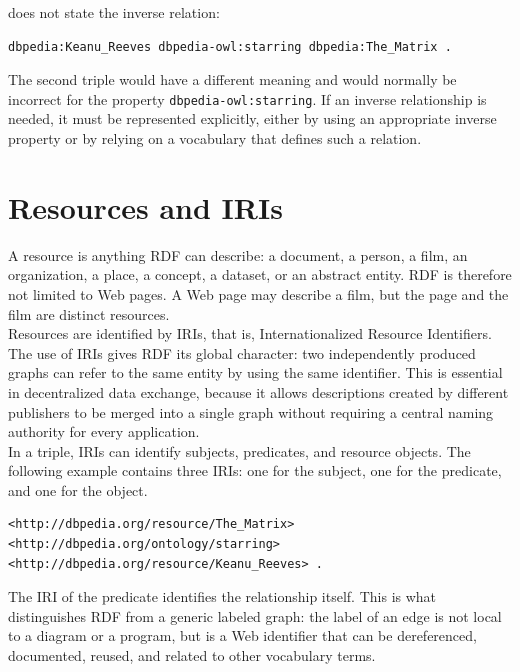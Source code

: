 \documentclass{scrbook}
\begin{document}
	does not state the inverse relation:
	
	\begin{lstlisting}
dbpedia:Keanu_Reeves dbpedia-owl:starring dbpedia:The_Matrix .
	\end{lstlisting}
	
	The second triple would have a different meaning and would normally be incorrect for the property \texttt{dbpedia-owl:starring}. If an inverse relationship is needed, it must be represented explicitly, either by using an appropriate inverse property or by relying on a vocabulary that defines such a relation.
	
	\section{Resources and IRIs}
	
	A resource is anything RDF can describe: a document, a person, a film, an organization, a place, a concept, a dataset, or an abstract entity. RDF is therefore not limited to Web pages. A Web page may describe a film, but the page and the film are distinct resources.\\
	
	Resources are identified by IRIs, that is, Internationalized Resource Identifiers. The use of IRIs gives RDF its global character: two independently produced graphs can refer to the same entity by using the same identifier. This is essential in decentralized data exchange, because it allows descriptions created by different publishers to be merged into a single graph without requiring a central naming authority for every application.\\
	
	In a triple, IRIs can identify subjects, predicates, and resource objects. The following example contains three IRIs: one for the subject, one for the predicate, and one for the object.
	
	\begin{lstlisting}
<http://dbpedia.org/resource/The_Matrix>
<http://dbpedia.org/ontology/starring>
<http://dbpedia.org/resource/Keanu_Reeves> .
	\end{lstlisting}
	
	The IRI of the predicate identifies the relationship itself. This is what distinguishes RDF from a generic labeled graph: the label of an edge is not local to a diagram or a program, but is a Web identifier that can be dereferenced, documented, reused, and related to other vocabulary terms.
	
\end{document}
